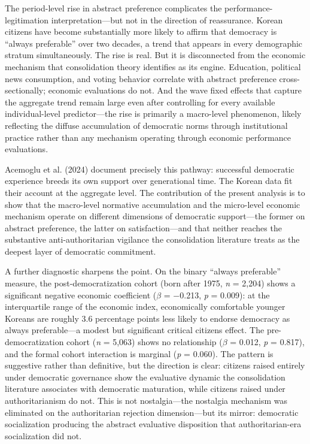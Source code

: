 \documentclass[
  12pt,
  12pt,
  letterpaper]{article}
\begin{document}
The period-level rise in abstract preference complicates the
performance-legitimation interpretation---but not in the direction of
reassurance. Korean citizens have become substantially more likely to
affirm that democracy is ``always preferable'' over two decades, a trend
that appears in every demographic stratum simultaneously. The rise is
real. But it is disconnected from the economic mechanism that
consolidation theory identifies as its engine. Education, political news
consumption, and voting behavior correlate with abstract preference
cross-sectionally; economic evaluations do not. And the wave fixed
effects that capture the aggregate trend remain large even after
controlling for every available individual-level predictor---the rise is
primarily a macro-level phenomenon, likely reflecting the diffuse
accumulation of democratic norms through institutional practice rather
than any mechanism operating through economic performance evaluations.

Acemoglu et al. (2024) document precisely this pathway: successful
democratic experience breeds its own support over generational time. The
Korean data fit their account at the aggregate level. The contribution
of the present analysis is to show that the macro-level normative
accumulation and the micro-level economic mechanism operate on different
dimensions of democratic support---the former on abstract preference,
the latter on satisfaction---and that neither reaches the substantive
anti-authoritarian vigilance the consolidation literature treats as the
deepest layer of democratic commitment.

A further diagnostic sharpens the point. On the binary ``always
preferable'' measure, the post-democratization cohort (born after 1975,
\emph{n} = 2,204) shows a significant negative economic coefficient
(\(\beta\) = −0.213, \emph{p} = 0.009): at the interquartile range of
the economic index, economically comfortable younger Koreans are roughly
3.6 percentage points less likely to endorse democracy as always
preferable---a modest but significant critical citizens effect. The
pre-democratization cohort (\emph{n} = 5,063) shows no relationship
(\(\beta\) = 0.012, \emph{p} = 0.817), and the formal cohort interaction
is marginal (\emph{p} = 0.060). The pattern is suggestive rather than
definitive, but the direction is clear: citizens raised entirely under
democratic governance show the evaluative dynamic the consolidation
literature associates with democratic maturation, while citizens raised
under authoritarianism do not. This is not nostalgia---the nostalgia
mechanism was eliminated on the authoritarian rejection dimension---but
its mirror: democratic socialization producing the abstract evaluative
disposition that authoritarian-era socialization did not.
\end{document}

